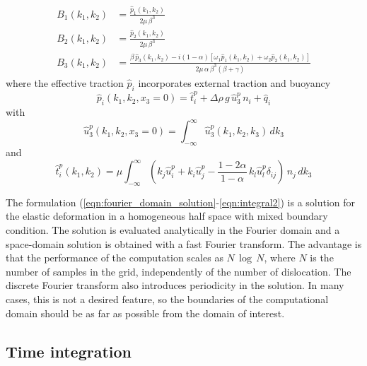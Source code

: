 \documentclass[10pt]{article}
\begin{document}
\begin{equation}
\begin{aligned}
B_1(k_1,k_2)&=\frac{\hat{p}_1(k_1,k_2)}{2\mu\,\beta^3}\\
B_2(k_1,k_2)&=\frac{\hat{p}_2(k_1,k_2)}{2\mu\,\beta^3}\\
B_3(k_1,k_2)&=\frac{\beta\,\hat{p}_3(k_1,k_2)-i(1-\alpha)[\omega_1\hat{p}_1(k_1,k_2)+\omega_2\hat{p}_2(k_1,k_2)]}{2\mu\,\alpha\,\beta^3(\beta+\gamma)}
\end{aligned}
\end{equation}
where the effective traction $\hat{p}_i$ incorporates external traction and buoyancy
\begin{equation}\label{eqn:last_degree_freedom}
\hat{p}_i(k_1,k_2,x_3=0)=\hat{t}^p_i+\Delta\rho\,g\,\hat{u}^p_3\,n_i+\hat{q}_i
\end{equation}
%
with
%
\begin{equation}\label{eqn:integral1}
\hat{u}_3^p(k_1,k_2,x_3=0)=\int_{-\infty}^\infty\hat{u}^p_3(k_1,k_2,k_3)\,dk_3
\end{equation}
and
\begin{equation}\label{eqn:integral2}
\hat{t}^p_i(k_1,k_2)=\mu\int_{-\infty}^\infty\left(k_j\hat{u}^p_i+k_i\hat{u}^p_j-\frac{1-2\alpha}{1-\alpha}\,k_l\hat{u}^p_l\delta_{ij}\right)\,n_j\,dk_3
\end{equation}


The formulation (\ref{eqn:fourier_domain_solution}-\ref{eqn:integral2}) is a solution for the elastic deformation in a homogeneous half space with mixed boundary condition. The solution is evaluated analytically in the Fourier domain and a space-domain solution is obtained with a fast Fourier transform. The advantage is that the performance of the computation scales as $N\,\log\,N$, where $N$ is the number of samples in the grid, independently of the number of dislocation. The discrete Fourier transform also introduces periodicity in the solution. In many cases, this is not a desired feature, so the boundaries of the computational domain should be as far as possible from the domain of interest.

\subsection{Time integration}
\end{document}
